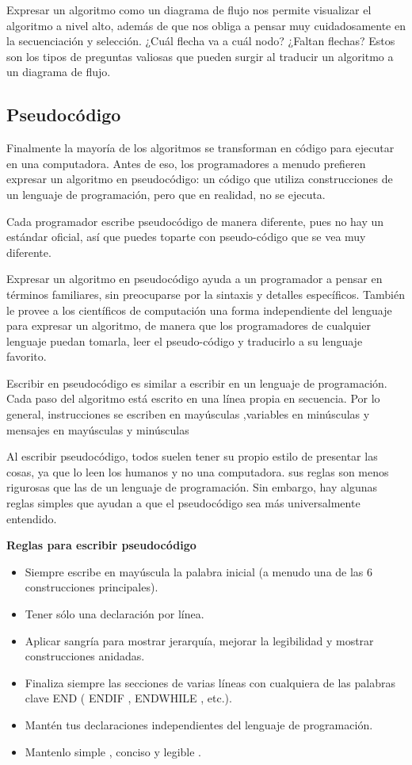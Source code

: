 Expresar un algoritmo como un diagrama de flujo nos permite visualizar el algoritmo a nivel alto, además de que nos obliga a pensar muy cuidadosamente en la secuenciación y selección. ¿Cuál flecha va a cuál nodo? ¿Faltan flechas? Estos son los tipos de preguntas valiosas que pueden surgir al traducir un algoritmo a un diagrama de flujo.

\subsection{Pseudocódigo}

Finalmente la mayoría de los algoritmos se transforman en código para ejecutar en una computadora. Antes de eso, los programadores a menudo prefieren expresar un algoritmo en pseudocódigo: un código que utiliza construcciones de un lenguaje de programación, pero que en realidad, no se ejecuta. 

Cada programador escribe pseudocódigo de manera diferente, pues no hay un estándar oficial, así que puedes toparte con pseudo-código que se vea muy diferente. 

Expresar un algoritmo en pseudocódigo ayuda a un programador a pensar en términos familiares, sin preocuparse por la sintaxis y detalles específicos. También le provee a los científicos de computación una forma independiente del lenguaje para expresar un algoritmo, de manera que los programadores de cualquier lenguaje puedan tomarla, leer el pseudo-código y traducirlo a su lenguaje favorito.

Escribir en pseudocódigo es similar a escribir en un lenguaje de programación. Cada paso del algoritmo está escrito en una línea propia en secuencia. Por lo general, instrucciones se escriben en mayúsculas ,variables en minúsculas y mensajes en mayúsculas y minúsculas

Al escribir pseudocódigo, todos suelen tener su propio estilo de presentar las cosas, ya que lo leen los humanos y no una computadora. sus reglas son menos rigurosas que las de un lenguaje de programación. Sin embargo, hay algunas reglas simples que ayudan a que el pseudocódigo sea más universalmente entendido.

\textbf{Reglas para escribir pseudocódigo}

\begin{itemize}
	\item Siempre escribe en mayúscula la palabra inicial (a menudo una de las 6 construcciones principales).
	\item Tener sólo una declaración por línea.
	\item Aplicar sangría para mostrar jerarquía, mejorar la legibilidad y mostrar construcciones anidadas.
	\item Finaliza siempre las secciones de varias líneas con cualquiera de las palabras clave END ( ENDIF , ENDWHILE , etc.).
	\item Mantén tus declaraciones independientes del lenguaje de programación.
	\item Mantenlo simple , conciso y legible .
\end{itemize}

